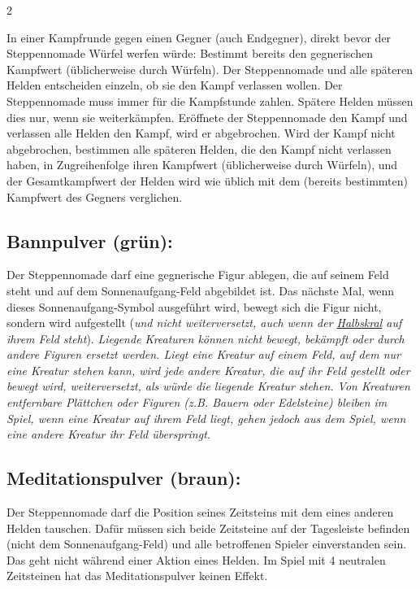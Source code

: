 \documentclass[10pt, a4paper, oneside]{book}
\newcommand{\fan}[1]{\textit{#1}}
\begin{document}
\begin{multicols*}{2}
\begin{nobgcolor}
In einer Kampfrunde gegen einen Gegner (auch Endgegner\supercite{90008}), direkt bevor der Steppennomade Würfel werfen würde: Bestimmt bereits den gegnerischen Kampfwert (üblicherweise durch Würfeln).
\supercite{mh-pulver}
Der Steppennomade und alle späteren Helden entscheiden einzeln, ob sie den Kampf verlassen wollen. Der Steppennomade muss immer für die Kampfstunde zahlen. Spätere Helden müssen dies nur, wenn sie weiterkämpfen. Eröffnete der Steppennomade den Kampf und verlassen alle Helden den Kampf, wird er abgebrochen. Wird der Kampf nicht abgebrochen, bestimmen alle späteren Helden, die den Kampf nicht verlassen haben, in Zugreihenfolge ihren Kampfwert (üblicherweise durch Würfeln), und der Gesamtkampfwert der Helden wird wie üblich mit dem (bereits bestimmten) Kampfwert des Gegners verglichen.
\supercite{89624,89625,90058}




\subsection{Bannpulver (grün):}

Der Steppennomade darf eine gegnerische Figur ablegen, die auf seinem Feld steht und auf dem Sonnenaufgang-Feld abgebildet ist\supercite{90058}. Das nächste Mal, wenn dieses Sonnenaufgang-Symbol ausgeführt wird, bewegt sich die Figur nicht, sondern wird aufgestellt\supercite{mh-pulver} (\fan{und nicht weiterversetzt, auch wenn der \hyperref[halbskral]{Halbskral} auf ihrem Feld steht}).
\fan{Liegende Kreaturen können nicht bewegt, bekämpft oder durch andere Figuren ersetzt werden. Liegt eine Kreatur auf einem Feld, auf dem nur eine Kreatur stehen kann, wird jede andere Kreatur, die auf ihr Feld gestellt oder bewegt wird, weiterversetzt, als würde die liegende Kreatur stehen. Von Kreaturen entfernbare Plättchen oder Figuren (z.B. Bauern oder Edelsteine) bleiben im Spiel, wenn eine Kreatur auf ihrem Feld liegt, gehen jedoch aus dem Spiel, wenn eine andere Kreatur ihr Feld überspringt.}





\subsection{Meditationspulver (braun):}

Der Steppennomade darf die Position seines Zeitsteins mit dem eines anderen Helden tauschen. Dafür müssen sich beide Zeitsteine auf der Tagesleiste befinden (nicht dem Sonnenaufgang-Feld\supercite{mh-begleitheft}) und alle betroffenen Spieler einverstanden sein.
\supercite{mh-pulver}
Das geht nicht während einer Aktion eines Helden.
\supercite{88552}
Im Spiel mit 4 neutralen Zeitsteinen hat das Meditationspulver keinen Effekt.



\end{nobgcolor}
\end{multicols*}
\end{document}
